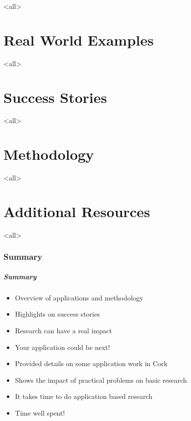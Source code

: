 \mode<all>{}

\part{Real World Examples}
\frame{\partpage}

\mode<all>{}

\part{Success Stories}
\frame{\partpage}

\mode<all>{}

\part{Methodology}
\frame{\partpage}

\mode<all>{}

\part{Additional Resources}
\frame{\partpage}

\mode<all>{}

\section{Summary}

\begin{frame}
\frametitle{Summary}
\begin{itemize}
\item Overview of applications and methodology
\item Highlights on success stories
\item Research can have a real impact
\item Your application could be next!
\item Provided details on some application work in Cork
\item Shows the impact of practical problems on basic research
\item It takes time to do application based research
\item Time well spent!
\end{itemize}
\end{frame}

